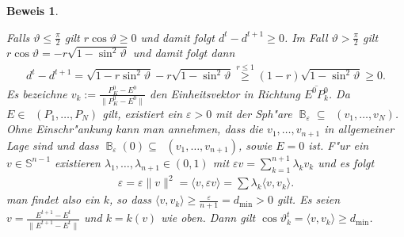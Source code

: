 \documentclass[paper=A4, twoside, chapterprefix=true, bibliography=totoc, headsepline]{scrbook}
\let\temp\phi
\let\phi\varphi
\let\varphi\temp
\let\temp\theta
\let\theta\vartheta
\let\vartheta\temp
\let\temp\epsilon
\let\epsilon\varepsilon
\let\varepsilon\temp
\let\temp\rho
\let\rho\varrho
\let\varrho\temp
\newcommand{\tikzgitter}[3][0.25]{ %
	\draw[step=#1,gray!15] #2 grid #3;
	\draw[step=2*#1,gray!30] #2 grid #3;
	\fill (0,0) circle(0.1); 
}
\DeclareMathOperator{\B}{\mathbb{B}} %
\renewcommand{\S}{\mathbb{S}}
\DeclareMathOperator{\conv}{conv} %
\DeclareMathOperator{\convo}{\stackrel{\circ}{\conv}} %
\newcommand{\normVek}[1]{\frac{#1}{\|#1\|}} %
\theoremstyle{nonumberbreak}
\newtheorem{bew}{Beweis}
\theoremstyle{emptybreak}
\theoremstyle{break}
\begin{document}
\begin{bew}
\begin{center}
\end{center}
Falls $\theta \le \frac{\pi}{2}$ gilt $r \cos \theta \ge 0$ und damit folgt $d^t - d^{t+1} \ge 0$. Im Fall $\theta > \frac{\pi}{2}$ gilt $r \cos \theta = -r \sqrt{1 - \sin^2 \theta}$ und damit folgt dann
\begin{align*}
	d^t - d^{t+1} = \sqrt{1 - r \sin^2 \theta} - r \sqrt{1 - \sin^2 \theta} \overset{r \le 1}{\ge} (1 - r) \sqrt{1 - \sin^2 \theta} \ge 0.
\end{align*}
Es bezeichne $v_k := \normVek{P_K^0 - E^0}$ den Einheitsvektor in Richtung $\overline{E^0P_k^0}$.
Da $E \in \convo(P_1, \ldots, P_N)$ gilt, existiert ein $\epsilon > 0$ mit der Sph"are $\B_\epsilon \subseteq \convo(v_1, \ldots, v_N)$.
Ohne Einschr"ankung kann man annehmen, dass die $v_1, \ldots, v_{n+1}$ in allgemeiner Lage sind und dass $\B_\epsilon(0) \subseteq \convo(v_1, \ldots, v_{n+1})$, sowie $E = 0$ ist.
F"ur ein $v \in \S^{n-1}$ existieren $\lambda_1, \ldots, \lambda_{n+1} \in (0,1)$ mit $\epsilon v = \sum_{k=1}^{n+1} \lambda_k v_k$ und es folgt
\begin{align*}
	\epsilon = \epsilon \|v\|^2 = \langle v, \epsilon v \rangle = \sum \lambda_k \langle v, v_k \rangle.
\end{align*}
man findet also ein $k$, so dass $\langle v, v_k \rangle \ge \frac{\epsilon}{n+1} = d_{\min} > 0$ gilt.
Es seien $v = \normVek{E^{t+1} - E^t}$ und $k = k(v)$ wie oben. Dann gilt $\cos \theta_k^t = \langle v, v_k \rangle \ge d_{\min}$.
\begin{center}\begin{tikzpicture}[font=\scriptsize,scale=1]
	

\end{tikzpicture}
\end{center}
\end{bew}
\end{document}
